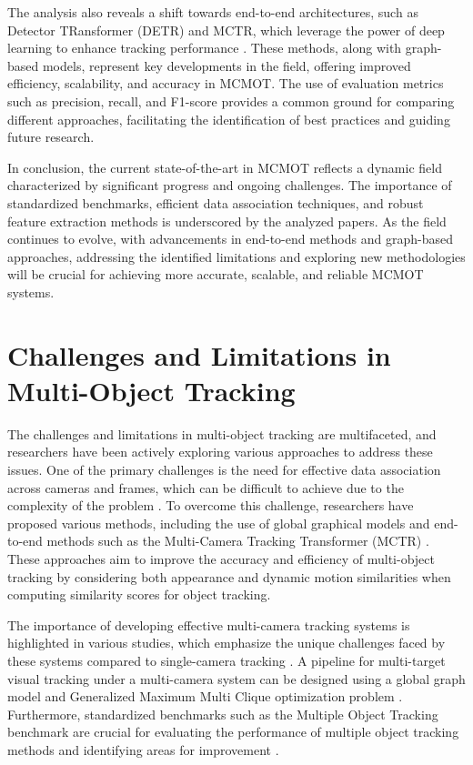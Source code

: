 \documentclass[conference]{IEEEtran}
\begin{document}
The analysis also reveals a shift towards end-to-end architectures, such as Detector TRansformer (DETR) and MCTR, which leverage the power of deep learning to enhance tracking performance \cite{MCTR: Multi Camera Tracking Transformer}. These methods, along with graph-based models, represent key developments in the field, offering improved efficiency, scalability, and accuracy in MCMOT. The use of evaluation metrics such as precision, recall, and F1-score provides a common ground for comparing different approaches, facilitating the identification of best practices and guiding future research.

In conclusion, the current state-of-the-art in MCMOT reflects a dynamic field characterized by significant progress and ongoing challenges. The importance of standardized benchmarks, efficient data association techniques, and robust feature extraction methods is underscored by the analyzed papers. As the field continues to evolve, with advancements in end-to-end methods and graph-based approaches, addressing the identified limitations and exploring new methodologies will be crucial for achieving more accurate, scalable, and reliable MCMOT systems.

\section{Challenges and Limitations in Multi-Object Tracking}
The challenges and limitations in multi-object tracking are multifaceted, and researchers have been actively exploring various approaches to address these issues. One of the primary challenges is the need for effective data association across cameras and frames, which can be difficult to achieve due to the complexity of the problem \cite{Challenge of Multi-Camera Tracking}. To overcome this challenge, researchers have proposed various methods, including the use of global graphical models \cite{An equalised global graphical model-based approach for multi-camera object tracking} and end-to-end methods such as the Multi-Camera Tracking Transformer (MCTR) \cite{MCTR}. These approaches aim to improve the accuracy and efficiency of multi-object tracking by considering both appearance and dynamic motion similarities when computing similarity scores for object tracking.

The importance of developing effective multi-camera tracking systems is highlighted in various studies, which emphasize the unique challenges faced by these systems compared to single-camera tracking \cite{Challenge of Multi-Camera Tracking}. A pipeline for multi-target visual tracking under a multi-camera system can be designed using a global graph model and Generalized Maximum Multi Clique optimization problem \cite{Multi-camera Multi-Object Tracking}. Furthermore, standardized benchmarks such as the Multiple Object Tracking benchmark are crucial for evaluating the performance of multiple object tracking methods and identifying areas for improvement \cite{Tracking the Trackers: An Analysis of the State of the Art in Multiple Object Tracking}.
\end{document}
